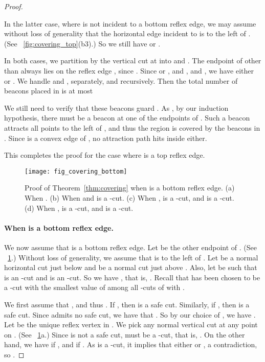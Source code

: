 \documentclass[11pt]{article}
\theoremstyle{definition}
\begin{document}
\begin{proof}
\begin{enumerate}[(a)]
\begin{enumerate}[(i)]
 In the latter case, where  is not incident to a bottom reflex edge,
 we may assume without loss of generality that the horizontal edge incident to 
 is to the left of . (See \figurename~\ref{fig:covering_top}(b3).)
 So we still have  or .

 In both cases, we partition  by the vertical cut  at  into  and .
 The endpoint of  other than  always lies on the reflex edge ,
 since .
 Since  or , and , and
 ,
 we have either  or .
 We handle  and , separately, and recursively.
 Then the total number of beacons placed in  is at most
 
 We still need  to verify that these beacons guard .
 As , by our induction hypothesis, there must be a beacon at one of the 
 endpoints of .
 Such a beacon attracts all points to the left of , and thus
 the region  is covered by the beacons in .
 Since  is a convex edge of , no attraction path hits  inside 
 either.
 \end{enumerate}

\end{enumerate}
This completes the proof for the case where  is a top reflex edge.

\begin{figure}[tb]
\centering
\texttt{[image: fig\_covering\_bottom]}
\caption{Proof of Theorem~\ref{thm:covering} when  is a bottom reflex edge.
(a) When .
(b) When  and  is a -cut.
(c) When ,  is a -cut, and  is a -cut.
(d) When ,  is a -cut, and  is a -cut. }
\label{fig:covering_bottom}
\end{figure}


\paragraph{When  is a bottom reflex edge.}
We now assume that  is a bottom reflex edge.
Let  be the other endpoint of . (See \figurename~\ref{fig:covering_bottom}.)
Without loss of generality, we assume that  is to the left of .
Let  be a normal horizontal cut just below  and
 be a normal cut just above .
Also, let  be such that  is an -cut
and  is an -cut.
So we have ,
that is, .
Recall that  has been chosen to be a -cut
with the smallest value of  among all -cuts  of  with .

We first assume that , and thus
 .
 If , then  is a safe cut.
 Similarly, if , then  is a safe cut.
 Since  admits no safe cut, we have that .
 So by our choice of , we have .
 Let  be the unique reflex vertex in .
 We pick any normal vertical cut  at any point on .
 (See \figurename~\ref{fig:covering_bottom}a.)
Since  is not a safe cut,  must be a -cut, that is, .
On the other hand, we have  if ,
and  if .
As  is a -cut, it implies that either  or , a contradiction, so .


\end{proof}
\end{document}
